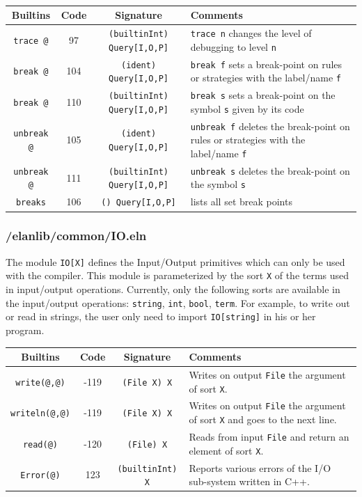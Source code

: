 ~\\
\noindent \begin{tabular}{|c|c|c|p{}|}
\hline
{\bf Builtins} & {\bf Code} & {\bf Signature} & {\bf Comments} \\
\hline
\hline
{\tt trace @}           & 97 & {\tt (builtinInt) Query[I,O,P]} & {\tt trace n} changes the level of debugging to level {\tt n}\\
{\tt break @}           & 104 & {\tt (ident) Query[I,O,P]} & {\tt break f} sets a break-point on rules or strategies  with the label/name {\tt f}\\
{\tt break @}           & 110 & {\tt (builtinInt) Query[I,O,P]} & {\tt break s} sets a break-point on the symbol {\tt s} given by its code\\
{\tt unbreak @}         & 105 & {\tt (ident) Query[I,O,P]} & {\tt unbreak f} deletes the break-point on rules or strategies  with the label/name {\tt f}\\
{\tt unbreak @}         & 111 & {\tt (builtinInt) Query[I,O,P]} & {\tt unbreak s} deletes the break-point on the symbol {\tt s}\\
{\tt breaks}            & 106 & {\tt () Query[I,O,P]} & lists all set break points\\
\hline
\end{tabular}

\subsubsection{/elanlib/common/IO.eln}
The module {\tt IO[X]} defines the Input/Output primitives which can only be used with the compiler.
This module is parameterized by the sort {\tt X} of the terms used in input/output operations.
Currently, only the following sorts are available in the input/output operations: {\tt string}, {\tt int}, {\tt bool}, {\tt term}.
For example, to write out or read in strings, the user only need to import {\tt IO[string]} in his or her program.

\begin{tabular}{|c|c|c|p{}|}
\hline
{\bf Builtins} & {\bf Code} & {\bf Signature} & {\bf Comments} \\
\hline
\hline
{\tt write(@,@)}      & -119 & {\tt (File X) X}          & Writes on output {\tt File} the argument of sort {\tt X}.\\
{\tt writeln(@,@)}      & -119 & {\tt (File X) X}          & Writes on output {\tt File} the argument of sort {\tt X} and goes to the next line.\\
{\tt read(@)}         & -120 & {\tt (File) X}            & Reads from input {\tt File} and return an element of sort {\tt X}.\\
{\tt Error(@)}        & 123  & {\tt (builtinInt) X}     & Reports various errors of the I/O sub-system written in C++.\\
\hline
\end{tabular}

